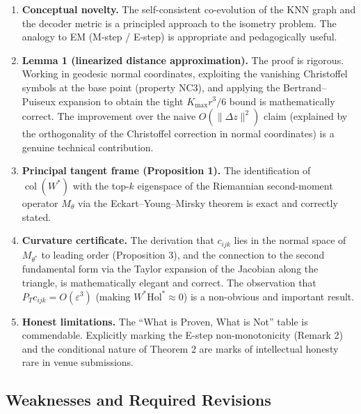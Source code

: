 \documentclass[11pt]{article}
\DeclareMathOperator{\col}{col}
\begin{document}
\begin{enumerate}
\item \textbf{Conceptual novelty.}
The self-consistent co-evolution of the KNN graph and the decoder metric is a
principled approach to the isometry problem. The analogy to EM (M-step / E-step)
is appropriate and pedagogically useful.

\item \textbf{Lemma 1 (linearized distance approximation).}
The proof is rigorous. Working in geodesic normal coordinates, exploiting
the vanishing Christoffel symbols at the base point (property NC3), and applying
the Bertrand--Puiseux expansion to obtain the tight $K_{\max} r^3 / 6$ bound is
mathematically correct. The improvement over the naive $O(\|\Delta z\|^2)$ claim
(explained by the orthogonality of the Christoffel correction in normal
coordinates) is a genuine technical contribution.

\item \textbf{Principal tangent frame (Proposition 1).}
The identification of $\col(W^*)$ with the top-$k$ eigenspace of the Riemannian
second-moment operator $M_\theta$ via the Eckart--Young--Mirsky theorem is exact
and correctly stated.

\item \textbf{Curvature certificate.}
The derivation that $c_{ijk}$ lies in the normal space of $M_{\theta^*}$ to
leading order (Proposition 3), and the connection to the second fundamental form
via the Taylor expansion of the Jacobian along the triangle, is mathematically
elegant and correct. The observation that $P_T c_{ijk} = O(\varepsilon^3)$
(making $W^* \mathrm{Hol}^* \approx 0$) is a non-obvious and important result.

\item \textbf{Honest limitations.}
The ``What is Proven, What is Not'' table is commendable. Explicitly marking the
E-step non-monotonicity (Remark 2) and the conditional nature of Theorem 2 are
marks of intellectual honesty rare in venue submissions.
\end{enumerate}

\subsection{Weaknesses and Required Revisions}
\end{document}

